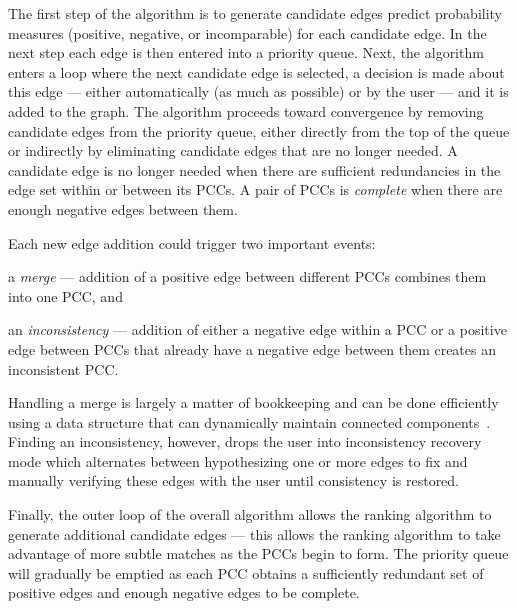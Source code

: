 The first step of the algorithm is to generate candidate edges predict probability measures (positive, negative,
  or incomparable) for each candidate edge.
In the next step each edge is then entered into a priority queue.
Next, the algorithm enters a loop where the next candidate edge is selected, a decision is made about this edge
  --- either automatically (as much as possible) or by the user --- and it is added to the graph.
The algorithm proceeds toward convergence by removing candidate edges from the priority queue, either directly
  from the top of the queue or indirectly by eliminating candidate edges that are no longer needed.
A candidate edge is no longer needed when there are sufficient redundancies in the edge set within or between its
  PCCs.
A pair of PCCs is \emph{complete} when there are enough negative edges between them.

Each new edge addition could trigger two important events:
\begin{enumin}
    \item a \emph{merge} --- addition of a positive edge between different
      PCCs combines them into one PCC, and

    \item an \emph{inconsistency} --- addition of either a negative edge within a PCC or a positive edge between
      PCCs that already have a negative edge between them creates an inconsistent PCC.
\end{enumin}
Handling a merge is largely a matter of bookkeeping and can be done efficiently using a data structure that can
  dynamically maintain connected components~\cite{jacob_holm_poly_logarithmic_1998}.
Finding an inconsistency, however, drops the user into inconsistency recovery mode which alternates between
  hypothesizing one or more edges to fix and manually verifying these edges with the user until consistency is
  restored.

Finally, the outer loop of the overall algorithm allows the ranking algorithm to generate additional candidate
  edges --- this allows the ranking algorithm to take advantage of more subtle matches as the PCCs begin to form.
The priority queue will gradually be emptied as each PCC obtains a sufficiently redundant set of positive edges
  and enough negative edges to be complete.

